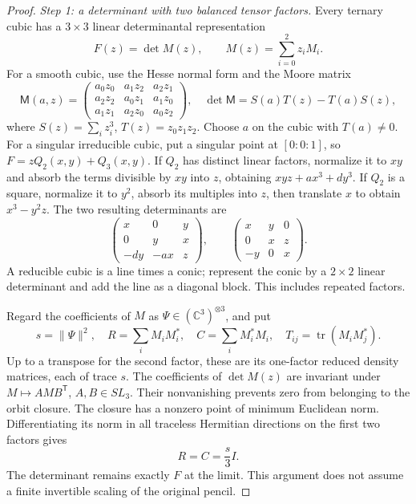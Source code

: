 \begin{proof}
\emph{Step 1: a determinant with two balanced tensor factors.}
Every ternary cubic has a \(3\times3\) linear determinantal representation
\[
 F(z)=\det M(z),\qquad M(z)=\sum_{i=0}^2z_iM_i.
 \tag{a}
\]
For a smooth cubic, use the Hesse normal form
\cite[Lemma 1]{geo_hesse2009} and the Moore matrix
\[
 \mathsf M(a,z)=
 \begin{pmatrix}
 a_0z_0&a_1z_2&a_2z_1\\
 a_2z_2&a_0z_1&a_1z_0\\
 a_1z_1&a_2z_0&a_0z_2
 \end{pmatrix},
 \quad
 \det\mathsf M=S(a)T(z)-T(a)S(z),
\]
where \(S(z)=\sum_i z_i^3\), \(T(z)=z_0z_1z_2\). Choose \(a\) on the
cubic with \(T(a)\ne0\).
For a singular irreducible cubic, put a singular point at
\([0:0:1]\), so \(F=zQ_2(x,y)+Q_3(x,y)\). If \(Q_2\) has distinct
linear factors, normalize it to \(xy\) and absorb the terms divisible
by \(xy\) into \(z\), obtaining \(xyz+ax^3+dy^3\).
If \(Q_2\) is a square, normalize it to \(y^2\), absorb its multiples
into \(z\), then translate \(x\) to obtain \(x^3-y^2z\).
The two resulting determinants are
\[
 \begin{pmatrix}x&0&y\\0&y&x\\-dy&-ax&z\end{pmatrix},
 \qquad
 \begin{pmatrix}x&y&0\\0&x&z\\-y&0&x\end{pmatrix}.
\]
A reducible cubic is a line times a conic; represent the conic by a
\(2\times2\) linear determinant and add the line as a diagonal block.
This includes repeated factors.

Regard the coefficients of \(M\) as
\(\Psi\in(\mathbb C^3)^{\otimes3}\), and put
\[
 s=\|\Psi\|^2,\quad
 R=\sum_iM_iM_i^*,\quad
 C=\sum_iM_i^*M_i,\quad
 T_{ij}=\operatorname{tr}(M_iM_j^*).
\]
Up to a transpose for the second factor, these are its one-factor
reduced density matrices, each of trace \(s\).
The coefficients of \(\det M(z)\) are invariant under
\(M\mapsto AMB^{\mathsf T}\), \(A,B\in SL_3\).
Their nonvanishing prevents zero from belonging to the orbit closure.
The closure has a nonzero point of minimum Euclidean norm. Differentiating
its norm in all traceless Hermitian directions on the first two factors
gives
\[
 R=C=\frac{s}{3}I.
 \tag{b}
\]
The determinant remains exactly \(F\) at the limit. This argument does
not assume a finite invertible scaling of the original pencil.


\end{proof}
